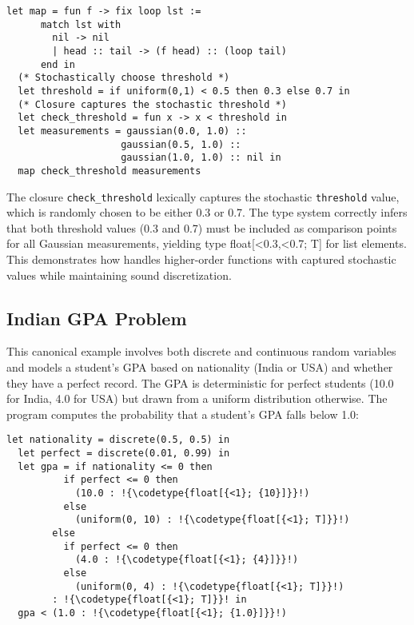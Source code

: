 \documentclass[acmsmall,screen,dvipsnames,x11names,nonacm,anonymous,review]{acmart}
\newcommand{\codetype}[1]{\textcolor{typecolor}{\ttfamily\small#1}}
\begin{document}
\begin{lstlisting}[aboveskip=1em,belowskip=1em,escapechar=!]
  let map = fun f -> fix loop lst :=
      match lst with
        nil -> nil
        | head :: tail -> (f head) :: (loop tail)
      end in
  (* Stochastically choose threshold *)
  let threshold = if uniform(0,1) < 0.5 then 0.3 else 0.7 in
  (* Closure captures the stochastic threshold *)
  let check_threshold = fun x -> x < threshold in
  let measurements = gaussian(0.0, 1.0) :: 
                    gaussian(0.5, 1.0) :: 
                    gaussian(1.0, 1.0) :: nil in
  map check_threshold measurements
\end{lstlisting}

\noindent The closure \texttt{check\_threshold} lexically captures the stochastic \texttt{threshold} value, which is randomly chosen to be either 0.3 or 0.7. The type system correctly infers that both threshold values (0.3 and 0.7) must be included as comparison points for all Gaussian measurements, yielding type \codetype{float[{<0.3,<0.7}; T]} for list elements. This demonstrates how \Slice{} handles higher-order functions with captured stochastic values while maintaining sound discretization.


\subsection{Indian GPA Problem}\label{sec:gpa}

This canonical example involves both discrete and continuous random variables and models a student's GPA based on nationality (India or USA) and whether they have a perfect record. The GPA is deterministic for perfect students (10.0 for India, 4.0 for USA) but drawn from a uniform distribution otherwise. The program computes the probability that a student's GPA falls below 1.0:

\begin{lstlisting}[aboveskip=1em,belowskip=1em,escapechar=!]
  let nationality = discrete(0.5, 0.5) in
  let perfect = discrete(0.01, 0.99) in
  let gpa = if nationality <= 0 then
          if perfect <= 0 then
            (10.0 : !{\codetype{float[{<1}; {10}]}}!)
          else
            (uniform(0, 10) : !{\codetype{float[{<1}; T]}}!)
        else
          if perfect <= 0 then
            (4.0 : !{\codetype{float[{<1}; {4}]}}!)
          else
            (uniform(0, 4) : !{\codetype{float[{<1}; T]}}!)
        : !{\codetype{float[{<1}; T]}}! in
  gpa < (1.0 : !{\codetype{float[{<1}; {1.0}]}}!)
\end{lstlisting}
\end{document}
